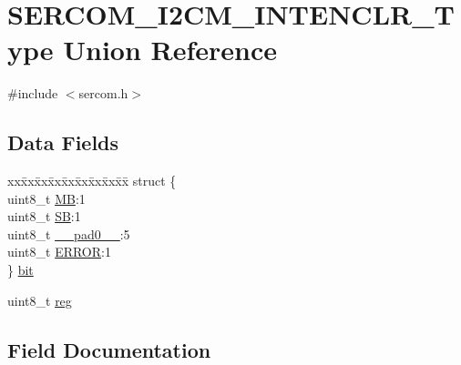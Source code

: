 \hypertarget{union_s_e_r_c_o_m___i2_c_m___i_n_t_e_n_c_l_r___type}{}\section{S\+E\+R\+C\+O\+M\+\_\+\+I2\+C\+M\+\_\+\+I\+N\+T\+E\+N\+C\+L\+R\+\_\+\+Type Union Reference}
\label{union_s_e_r_c_o_m___i2_c_m___i_n_t_e_n_c_l_r___type}


{\ttfamily \#include $<$sercom.\+h$>$}

\subsection*{Data Fields}
\begin{DoxyCompactItemize}
\item 
\begin{tabbing}
xx\=xx\=xx\=xx\=xx\=xx\=xx\=xx\=xx\=\kill
struct \{\\
\>uint8\_t \mbox{\hyperlink{union_s_e_r_c_o_m___i2_c_m___i_n_t_e_n_c_l_r___type_a01b7d76b02f32a7dcf9b9918ad43c95f}{MB}}:1\\
\>uint8\_t \mbox{\hyperlink{union_s_e_r_c_o_m___i2_c_m___i_n_t_e_n_c_l_r___type_af6e25191020f32790ed358bdb7152678}{SB}}:1\\
\>uint8\_t \mbox{\hyperlink{union_s_e_r_c_o_m___i2_c_m___i_n_t_e_n_c_l_r___type_a8b4eebe79ded0459acec2f4950102ba3}{\_\_pad0\_\_}}:5\\
\>uint8\_t \mbox{\hyperlink{union_s_e_r_c_o_m___i2_c_m___i_n_t_e_n_c_l_r___type_a4be51829c8720b7d159b77c39924afaa}{ERROR}}:1\\
\} \mbox{\hyperlink{union_s_e_r_c_o_m___i2_c_m___i_n_t_e_n_c_l_r___type_a17a8de1843dc24205288888daa967108}{bit}}\\

\end{tabbing}\item 
uint8\+\_\+t \mbox{\hyperlink{union_s_e_r_c_o_m___i2_c_m___i_n_t_e_n_c_l_r___type_a9428adc9af4653a2050e2536b55dec8d}{reg}}
\end{DoxyCompactItemize}


\subsection{Field Documentation}
\mbox{\label{union_s_e_r_c_o_m___i2_c_m___i_n_t_e_n_c_l_r___type_a8b4eebe79ded0459acec2f4950102ba3}} 
